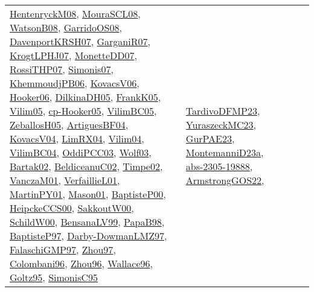 {\begin{longtable}{llp{6cm}p{6cm}p{6cm}}
\href{papers/HentenryckM08.pdf}{HentenryckM08}\cite{HentenryckM08}, \href{papers/MouraSCL08.pdf}{MouraSCL08}\cite{MouraSCL08}, \href{papers/WatsonB08.pdf}{WatsonB08}\cite{WatsonB08}, \href{articles/GarridoOS08.pdf}{GarridoOS08}\cite{GarridoOS08}, \href{papers/DavenportKRSH07.pdf}{DavenportKRSH07}\cite{DavenportKRSH07}, \href{papers/GarganiR07.pdf}{GarganiR07}\cite{GarganiR07}, \href{papers/KrogtLPHJ07.pdf}{KrogtLPHJ07}\cite{KrogtLPHJ07}, \href{papers/MonetteDD07.pdf}{MonetteDD07}\cite{MonetteDD07}, \href{papers/RossiTHP07.pdf}{RossiTHP07}\cite{RossiTHP07}, \href{articles/Simonis07.pdf}{Simonis07}\cite{Simonis07}, \href{papers/KhemmoudjPB06.pdf}{KhemmoudjPB06}\cite{KhemmoudjPB06}, \href{papers/KovacsV06.pdf}{KovacsV06}\cite{KovacsV06}, \href{articles/Hooker06.pdf}{Hooker06}\cite{Hooker06}, \href{papers/DilkinaDH05.pdf}{DilkinaDH05}\cite{DilkinaDH05}, \href{papers/FrankK05.pdf}{FrankK05}\cite{FrankK05}, \href{papers/Vilim05.pdf}{Vilim05}\cite{Vilim05}, \href{papers/cp-Hooker05.pdf}{cp-Hooker05}\cite{cp-Hooker05}, \href{articles/VilimBC05.pdf}{VilimBC05}\cite{VilimBC05}, \href{articles/ZeballosH05.pdf}{ZeballosH05}\cite{ZeballosH05}, \href{papers/ArtiguesBF04.pdf}{ArtiguesBF04}\cite{ArtiguesBF04}, \href{papers/KovacsV04.pdf}{KovacsV04}\cite{KovacsV04}, \href{papers/LimRX04.pdf}{LimRX04}\cite{LimRX04}, \href{papers/Vilim04.pdf}{Vilim04}\cite{Vilim04}, \href{papers/VilimBC04.pdf}{VilimBC04}\cite{VilimBC04}, \href{papers/OddiPCC03.pdf}{OddiPCC03}\cite{OddiPCC03}, \href{papers/Wolf03.pdf}{Wolf03}\cite{Wolf03}, \href{papers/Bartak02.pdf}{Bartak02}\cite{Bartak02}, \href{papers/BeldiceanuC02.pdf}{BeldiceanuC02}\cite{BeldiceanuC02}, \href{articles/Timpe02.pdf}{Timpe02}\cite{Timpe02}, \href{papers/VanczaM01.pdf}{VanczaM01}\cite{VanczaM01}, \href{papers/VerfaillieL01.pdf}{VerfaillieL01}\cite{VerfaillieL01}, \href{articles/MartinPY01.pdf}{MartinPY01}\cite{MartinPY01}, \href{articles/Mason01.pdf}{Mason01}\cite{Mason01}, \href{articles/BaptisteP00.pdf}{BaptisteP00}\cite{BaptisteP00}, \href{articles/HeipckeCCS00.pdf}{HeipckeCCS00}\cite{HeipckeCCS00}, \href{articles/SakkoutW00.pdf}{SakkoutW00}\cite{SakkoutW00}, \href{articles/SchildW00.pdf}{SchildW00}\cite{SchildW00}, \href{articles/BensanaLV99.pdf}{BensanaLV99}\cite{BensanaLV99}, \href{articles/PapaB98.pdf}{PapaB98}\cite{PapaB98}, \href{papers/BaptisteP97.pdf}{BaptisteP97}\cite{BaptisteP97}, \href{articles/Darby-DowmanLMZ97.pdf}{Darby-DowmanLMZ97}\cite{Darby-DowmanLMZ97}, \href{articles/FalaschiGMP97.pdf}{FalaschiGMP97}\cite{FalaschiGMP97}, \href{articles/Zhou97.pdf}{Zhou97}\cite{Zhou97}, \href{papers/Colombani96.pdf}{Colombani96}\cite{Colombani96}, \href{papers/Zhou96.pdf}{Zhou96}\cite{Zhou96}, \href{articles/Wallace96.pdf}{Wallace96}\cite{Wallace96}, \href{papers/Goltz95.pdf}{Goltz95}\cite{Goltz95}, \href{papers/SimonisC95.pdf}{SimonisC95}\cite{SimonisC95} & \href{papers/TardivoDFMP23.pdf}{TardivoDFMP23}\cite{TardivoDFMP23}, \href{papers/YuraszeckMC23.pdf}{YuraszeckMC23}\cite{YuraszeckMC23}, \href{articles/GurPAE23.pdf}{GurPAE23}\cite{GurPAE23}, \href{articles/MontemanniD23a.pdf}{MontemanniD23a}\cite{MontemanniD23a}, \href{articles/abs-2305-19888.pdf}{abs-2305-19888}\cite{abs-2305-19888}, \href{papers/ArmstrongGOS22.pdf}{ArmstrongGOS22}\cite{ArmstrongGOS22}, 
\end{longtable}}
